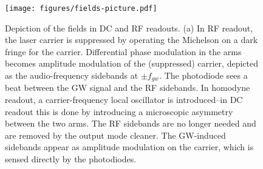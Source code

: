 \begin{figure}[p]
\texttt{[image: figures/fields-picture.pdf]}
\caption[Frequency-domain fields in DC and RF
  readouts]{\label{fig:sideband-picture}Depiction of the fields in DC
  and RF readouts.  (a) In RF readout, the laser carrier is suppressed
  by operating the Michelson on a dark fringe for the carrier.
  Differential phase modulation in the arms becomes amplitude
  modulation of the (suppressed) carrier, depicted as the
  audio-frequency sidebands at $\pm f_{gw}$.  The photodiode sees a
  beat between the GW signal and the RF sidebands.  In homodyne
  readout, a carrier-frequency local oscillator is introduced--in DC
  readout this is done by introducing a microscopic asymmetry between
  the two arms.  The RF sidebands are no longer needed and are removed
  by the output mode cleaner.  The GW-induced sidebands appear as
  amplitude modulation on the carrier, which is sensed directly by the
  photodiodes.}
\end{figure}

